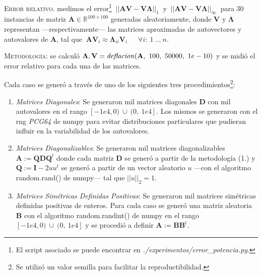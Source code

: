 \vspace{2em}
\noindent \textsc{Error relativo}. medimos el error\footnote{El script asociado se puede encontrar en \textit{./experimentos/error\_potencia.py}.}   $\ ||\mathbf{A} \mathbf{V} - \mathbf{V} \mathbf{\Lambda}||_1\ $ y $\ ||\mathbf{A} \mathbf{V} - \mathbf{V} \mathbf{\Lambda}||_\infty\ $ para 30 instancias de matriz $\mathbf{A} \in \mathbb{R}^{100 \times 100}$ generadas aleatoriamente, donde \textbf{V} y $\mathbf{\Lambda}$ representan ---respectivamente--- las matrices aproximadas de autovectores y autovalores de \textbf{A}, tal que $\ \mathbf{A}\mathbf{V}_i \approx \mathbf{\Lambda}_{ii} \mathbf{V}_i$\ \ \ $\forall i:\ 1\ ...\ n$.


\vspace{2em}
\noindent \textsc{Metodología}: se calculó  $\mathbf{\Lambda}, \mathbf{V} = \text{\textit{deflacion}}(\mathbf{A},\ 100,\ 50000,\ 1e-10)$ y se midió el error relativo para cada una de las matrices.

\vspace{1em}
\noindent Cada caso se generó a través de uno de los siguientes tres procedimientos\footnote{Se utilizó un valor semilla para facilitar la reproductibilidad.}:

\vspace{1em}
\begin{enumerate}
    \item \textit{Matrices Diagonales}: Se generaron mil matrices diagonales \textbf{D} con mil autovalores en el rango $[-1e4, 0)\ \cup\ (0,\ 1e4]$. Los mismos se generaron con el rng \textit{PCG64} de numpy para evitar distribuciones particulares que pudieran influir en la variabilidad de los autovalores.
    \\
    \item \textit{Matrices Diagonalizables}: Se generaron mil matrices diagonalizables $\mathbf{A} := \mathbf{Q} \mathbf{D} \mathbf{Q}^t$ donde cada matriz $\mathbf{D}$ se generó a partir de la metodología (1.) y $\mathbf{Q} := \mathbf{I} - 2uu^t$ se generó a partir de un vector aleatorio $u$ ---con el algoritmo random.rand() de numpy--- tal que $||u||_2 = 1$.
    \\
    \item \textit{Matrices Simétricas Definidas Positivas}: Se generaron mil matrices simétricas definidas positivas de enteros. Para cada caso se generó una matriz aleatoria \textbf{B} con el algoritmo random.randint() de numpy en el rango $[-1e4, 0)\ \cup\ (0,\ 1e4]$ y se procedió a definir $\mathbf{A} := \mathbf{B} \mathbf{B}^t$. 
\end{enumerate}

